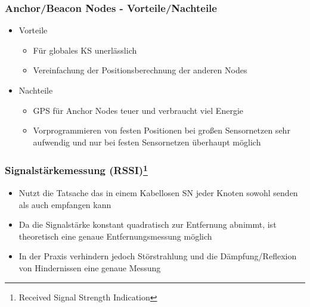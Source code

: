 \begin{frame}
\frametitle{Anchor/Beacon Nodes - Vorteile/Nachteile}

\begin{itemize}
  \item Vorteile
  \begin{itemize}
    \item Für globales KS unerlässlich
    \item Vereinfachung der Positionsberechnung der anderen Nodes
  \end{itemize}
  \item Nachteile
  \begin{itemize}
    \item GPS für Anchor Nodes teuer und verbraucht viel Energie
    \item Vorprogrammieren von festen Positionen bei großen
      Sensornetzen sehr aufwendig und nur bei festen Sensornetzen
      überhaupt möglich
  \end{itemize}
\end{itemize}
\end{frame}

\begin{frame}
\frametitle{Signalstärkemessung (RSSI)\footnote{Received Signal Strength Indication}}

\begin{itemize}
  \item Nutzt die Tatsache das in einem Kabellosen SN jeder Knoten
    sowohl senden als auch empfangen kann
  \item Da die Signalstärke konstant quadratisch zur Entfernung
    abnimmt, ist theoretisch eine genaue Entfernungsmessung möglich
  \item In der Praxis verhindern jedoch Störstrahlung und die
    Dämpfung/Reflexion von Hindernissen eine genaue Messung
\end{itemize}
\end{frame}

